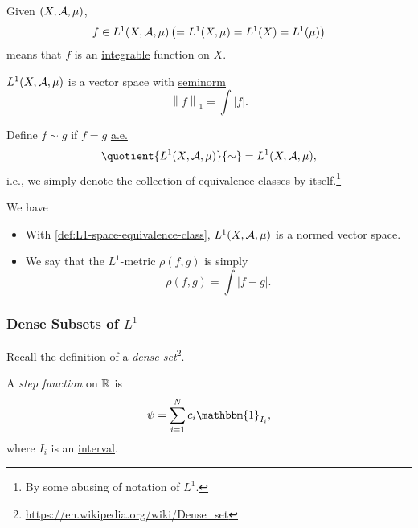 \begin{definition}[\(L^1\) Space]\label{def:L1-space}
	Given \((X, \mathcal{\MakeUppercase{a}} , \mu )\),
	\[
		f\in L^1(X, \mathcal{\MakeUppercase{a}} , \mu )\left( = L^1(X, \mu ) = L^1(X) = L^1(\mu )\right)
	\]
	means that \(f\) is an \hyperref[def:integrable]{integrable} function on \(X\).
\end{definition}

\begin{lemma}
	\(L^1(X, \mathcal{\MakeUppercase{a}} , \mu )\) is a vector space with \hyperref[def:seminorm]{seminorm}
	\[
		\left\lVert f\right\rVert _1 = \int \left\vert f \right\vert .
	\]
\end{lemma}

\begin{definition}\label{def:L1-space-equivalence-class}
	Define \(f\sim g\) if \(f = g\) \hyperref[def:mu-almost-everywhere]{a.e.}
	\[
		\quotient{L^1(X, \mathcal{\MakeUppercase{a}} , \mu )}{\sim} = L^1(X, \mathcal{\MakeUppercase{a}} , \mu ),
	\]
	i.e., we simply denote the collection of equivalence classes by itself.\footnote{By some abusing of notation of \(L^1\).}
\end{definition}
\begin{remark}
	We have
	\begin{itemize}
		\item With \autoref{def:L1-space-equivalence-class}, \(L^1(X, \mathcal{\MakeUppercase{a}} , \mu )\) is a normed vector space.
		\item We say that the \(L^1\)-metric \(\rho (f, g)\) is simply
		      \[
			      \rho (f, g) = \int \left\vert f - g \right\vert.
		      \]
	\end{itemize}
\end{remark}

\subsubsection{Dense Subsets of \(L^1\)}
\begin{note}
	Recall the definition of a \emph{dense set}\footnote{\url{https://en.wikipedia.org/wiki/Dense_set}}.
\end{note}

\begin{definition}\label{def:step-function}
	A \emph{step function} on \(\mathbb{\MakeUppercase{r}} \) is
	\[
		\psi = \sum\limits_{i=1}^{N} c_{i}\mathbbm{1}_{I_{i}},
	\]
	where \(I_{i}\) is an \underline{interval}.
\end{definition}

